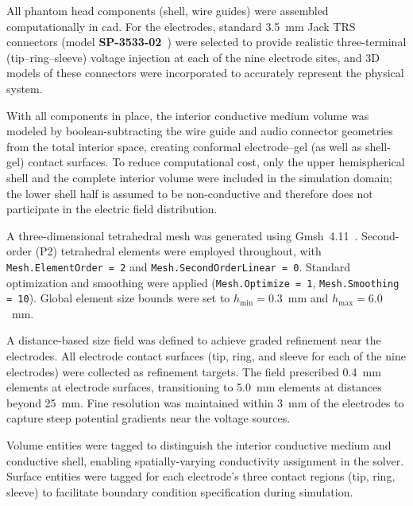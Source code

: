 All phantom head components (shell, wire guides) were assembled computationally 
in \gls{cad}. For the electrodes, standard 3.5~mm Jack TRS connectors (model 
\textbf{SP-3533-02}~\cite{jack_datasheet}) were selected to provide realistic 
three-terminal (tip--ring--sleeve) voltage injection at each of the nine electrode 
sites, and 3D models of these connectors were incorporated to accurately represent 
the physical system.

With all components in place, the interior conductive medium volume was modeled 
by boolean-subtracting the wire guide and audio connector geometries from the 
total interior space, creating conformal electrode--gel (as well as shell-gel) contact 
surfaces.  To reduce computational cost, only the upper hemispherical shell and the complete 
interior volume were included in the simulation domain; the lower shell half is 
assumed to be non-conductive and therefore does not participate in the electric 
field distribution.

A three-dimensional tetrahedral mesh was generated using Gmsh~4.11~\cite{gmsh}. 
Second-order (P2) tetrahedral elements were employed throughout, with 
\texttt{Mesh.ElementOrder = 2} and \texttt{Mesh.SecondOrderLinear = 0}. 
Standard optimization and smoothing were applied (\texttt{Mesh.Optimize = 1}, 
\texttt{Mesh.Smoothing = 10}). Global element size bounds were set to 
$h_{\min} = 0.3$~mm and $h_{\max} = 6.0$~mm.

A distance-based size field was defined to achieve graded refinement near the 
electrodes. All electrode contact surfaces (tip, ring, and sleeve for each of 
the nine electrodes) were collected as refinement targets. The field prescribed 
0.4~mm elements at electrode surfaces, transitioning to 5.0~mm elements at 
distances beyond 25~mm. Fine resolution was maintained within 3~mm of the 
electrodes to capture steep potential gradients near the voltage sources.

Volume entities were tagged to distinguish the interior conductive medium and 
conductive shell, enabling spatially-varying conductivity assignment in the 
solver. Surface entities were tagged for each electrode's three contact regions 
(tip, ring, sleeve) to facilitate boundary condition specification during simulation.

